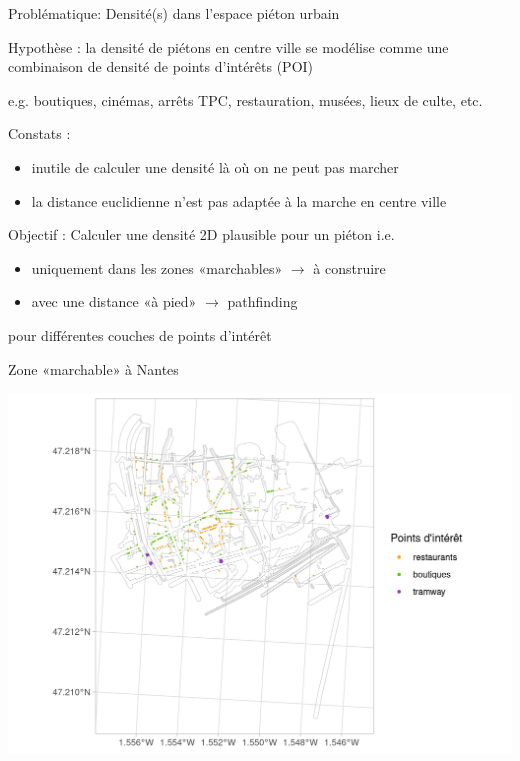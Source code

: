 \documentclass[9pt]{beamer}
\begin{document}
\begin{frame}{Problématique: Densité(s) dans l'espace piéton urbain }

Hypothèse : la densité de \alert{piétons} en centre ville se modélise comme une combinaison de densité de \alert{points d'intérêts} (POI)\\
\begin{scriptsize}
  e.g. boutiques, cinémas, arrêts TPC, restauration, musées, lieux de culte, etc.
\end{scriptsize}
\vspace{0.5cm}

Constats : 
\begin{itemize}
  \item inutile de calculer une densité là où on ne peut pas marcher 
  \item la distance euclidienne n'est pas adaptée à la marche en centre ville
\end{itemize}
\vspace{0.5cm}

Objectif : Calculer une densité 2D \alert{plausible} pour un piéton i.e.

\begin{itemize}
  \item uniquement dans les zones «marchables» $\rightarrow$ \alert{à construire}
  \item avec une distance «à pied» $\rightarrow$  \alert{pathfinding}
\end{itemize}
\vspace{0.5cm}
pour différentes couches de points d'intérêt
\end{frame}


\begin{frame}{Zone «marchable» à Nantes}
\begin{center}
\includegraphics[width=\textwidth]{ressources/images/zone_marchable.png} 
\end{center}
\end{frame}
\end{document}
